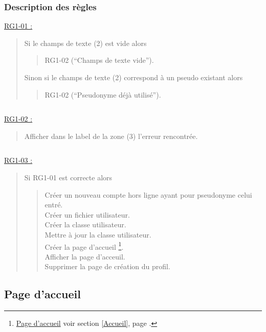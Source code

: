 \documentclass{report}
\begin{document}
		\subsubsection{Description des règles}
		
		\underline{RG1-01 :}
			\begin{quote}
				Si le champs de texte (2) est vide alors
				\begin{quote}
					RG1-02 (``Champs de texte vide'').
				\end{quote}
				Sinon si le champs de texte (2) correspond à un pseudo existant alors
				\begin{quote}
					RG1-02 (``Pseudonyme déjà utilisé'').
				\end{quote}		
			\end{quote}
		
		$\,$	
		
		\underline{RG1-02 :}
			\begin{quote}
				Afficher dans le label de la zone (3) l'erreur rencontrée.
			\end{quote}
			
		$\,$

		\underline{RG1-03 :}
			\begin{quote}
				Si RG1-01 est correcte alors
				\begin{quote}
					Créer un nouveau compte hors ligne ayant pour pseudonyme celui entré.\\
					Créer un fichier utilisateur.\\
					Créer la classe utilisateur.\\
					Mettre à jour la classe utilisateur.\\
					Créer la page d'accueil%
						\footnote[1]{
							\hyperlink{Page d'accueil}{Page d'accueil}
							\og voir section \ref{Accueil}, page \pageref{Accueil}.\fg
						}.\\
					Afficher la page d'acceuil\footnotemark[1].\\
					Supprimer la page de création du profil.
				\end{quote}
			\end{quote}
	
\newpage

	\subsection{Page d'accueil}
		\hypertarget{Accueil}{}
		\label{Accueil}

		\begin{center}	
			
		\end{center}
\end{document}
